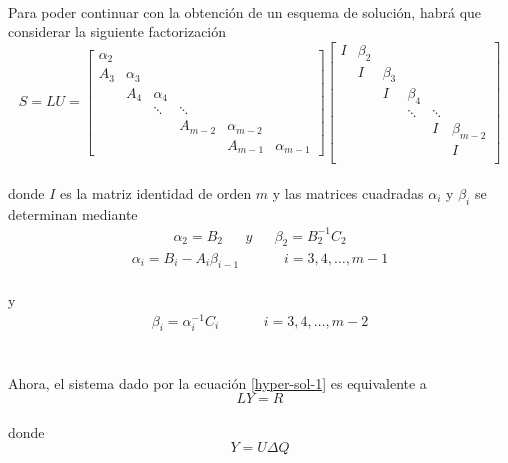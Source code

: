 \documentclass[letterpaper, openright, 12pt]{book}
\begin{document}
	\paragraph*{}
		Para poder continuar con la obtención de un esquema de solución, habrá que considerar la siguiente factorización
		\begin{equation}
			S = LU = \begin{bmatrix}
				\alpha_2\\
				A_3 & \alpha_3 \\
				& A_4 & \alpha_4\\
				& & \ddots & \ddots\\
				& & & A_{m-2} & \alpha_{m-2}\\
				& & & & A_{m-1} & \alpha_{m-1}
			\end{bmatrix}
			\begin{bmatrix}
				I & \beta_2\\
				& I & \beta_3\\
				& & I & \beta_4\\
				& & & \ddots & \ddots\\
				& & & & I & \beta_{m-2}\\
				& & & & & I\\
			\end{bmatrix}
		\end{equation}\\
		donde $I$ es la matriz identidad de orden $m$ y las matrices cuadradas $\alpha_i$ y $\beta_i$ se determinan mediante
		\begin{align}
			\alpha_2 = B_2 && y && \beta_2 = B_{2}^{-1} C_2
		\end{align}
		\begin{align}
			\alpha_i = B_i - A_i \beta_{i-1} &&&& i = 3, 4, \dots, m-1
		\end{align}\\
		y
		\begin{align}
			\beta_i = \alpha_{i}^{-1} C_i &&&& i = 3, 4, \dots, m-2
		\end{align}\\
		
	\paragraph*{}
		Ahora, el sistema dado por la ecuación \ref{hyper-sol-1} es equivalente a
		\begin{equation}
			LY = R
			\label{hyper-sol-2}
		\end{equation}\\
		donde
		\begin{equation}
			Y = U \Delta Q
			\label{hyper-sol-3}
		\end{equation}
	
\end{document}
